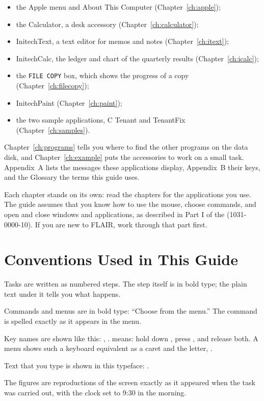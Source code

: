 \begin{itemize}
\item the Apple menu and About This Computer (Chapter~\ref{ch:apple});
\item the Calculator, a desk accessory (Chapter~\ref{ch:calculator});
\item InitechText, a text editor for memos and notes (Chapter~\ref{ch:itext});
\item InitechCalc\tm{}, the ledger and chart of the quarterly results
  (Chapter~\ref{ch:icalc});
\item the \texttt{FILE COPY} box, which shows the progress of a copy
  (Chapter~\ref{ch:filecopy});
\item InitechPaint\tm{} (Chapter~\ref{ch:paint});
\item the two sample applications, C Tenant and TenantFix (Chapter~\ref{ch:samples}).
\end{itemize}
Chapter~\ref{ch:programs} tells you where to find the other programs on the data disk, and
Chapter~\ref{ch:example} puts the accessories to work on a small task.
Appendix~A lists the messages these applications display, Appendix~B their
keys, and the Glossary the terms this guide uses.

Each chapter stands on its own: read the chapters for the applications you
use.  The guide assumes that you know how to use the mouse, choose
commands, and open and close windows and applications, as described in Part
I of the  (1031-0000-10).  If you are new to
FLAIR, work through that part first.

\section{Conventions Used in This Guide}
Tasks are written as numbered steps.  The step itself is in
bold type; the plain text under it tells you what happens.

Commands and menus are in bold type: ``Choose
 from the  menu.''  The command is spelled
exactly as it appears in the menu.

Key names are shown like this: , .
 means: hold down , press , and release both.
A menu shows such a keyboard equivalent as a caret and the letter,
.

Text that you type is shown in this typeface:
.

The figures are reproductions of the screen exactly as
it appeared when the task was carried out, with the clock set to 9:30 in
the morning.
